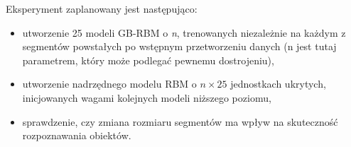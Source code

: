 \documentclass[a4paper,10pt]{report}
\begin{document}
Eksperyment zaplanowany jest następująco:

\begin{itemize}
	\item utworzenie 25 modeli GB-RBM o \textit{n}, trenowanych niezależnie na każdym z segmentów powstałych po wstępnym przetworzeniu danych (n jest tutaj parametrem, który może podlegać pewnemu dostrojeniu),
	\item utworzenie nadrzędnego modelu RBM o $\textit{n} \times 25$ jednostkach ukrytych, inicjowanych wagami kolejnych modeli niższego poziomu,
	\item sprawdzenie, czy zmiana rozmiaru segmentów ma wpływ na skuteczność rozpoznawania obiektów.
\end{itemize}


\nocite{*} %

\end{document}

